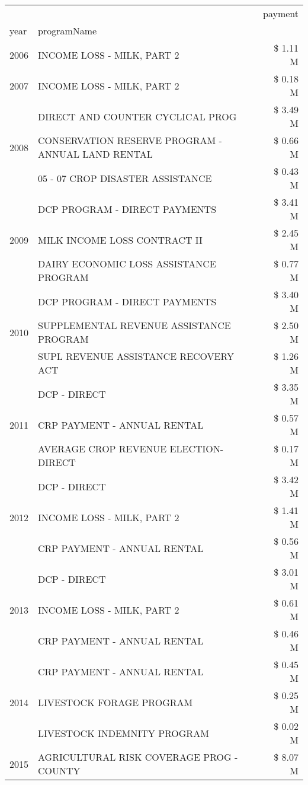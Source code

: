 \begin{tabular}{llr}
\toprule
 &  & payment \\
year & programName &  \\
\midrule
2006 & INCOME LOSS - MILK, PART 2 & \$ 1.11 M \\
\cline{1-3}
2007 & INCOME LOSS - MILK, PART 2 & \$ 0.18 M \\
\cline{1-3}
\multirow[t]{3}{*}{2008} & DIRECT AND COUNTER CYCLICAL PROG & \$ 3.49 M \\
 & CONSERVATION RESERVE PROGRAM - ANNUAL LAND RENTAL & \$ 0.66 M \\
 & 05 - 07 CROP DISASTER ASSISTANCE & \$ 0.43 M \\
\cline{1-3}
\multirow[t]{3}{*}{2009} & DCP PROGRAM - DIRECT PAYMENTS & \$ 3.41 M \\
 & MILK INCOME LOSS CONTRACT II & \$ 2.45 M \\
 & DAIRY ECONOMIC LOSS ASSISTANCE PROGRAM & \$ 0.77 M \\
\cline{1-3}
\multirow[t]{3}{*}{2010} & DCP PROGRAM - DIRECT PAYMENTS & \$ 3.40 M \\
 & SUPPLEMENTAL REVENUE ASSISTANCE PROGRAM & \$ 2.50 M \\
 & SUPL REVENUE ASSISTANCE RECOVERY ACT & \$ 1.26 M \\
\cline{1-3}
\multirow[t]{3}{*}{2011} & DCP - DIRECT & \$ 3.35 M \\
 & CRP PAYMENT - ANNUAL RENTAL & \$ 0.57 M \\
 & AVERAGE CROP REVENUE ELECTION-DIRECT & \$ 0.17 M \\
\cline{1-3}
\multirow[t]{3}{*}{2012} & DCP - DIRECT & \$ 3.42 M \\
 & INCOME LOSS - MILK, PART 2 & \$ 1.41 M \\
 & CRP PAYMENT - ANNUAL RENTAL & \$ 0.56 M \\
\cline{1-3}
\multirow[t]{3}{*}{2013} & DCP - DIRECT & \$ 3.01 M \\
 & INCOME LOSS - MILK, PART 2 & \$ 0.61 M \\
 & CRP PAYMENT - ANNUAL RENTAL & \$ 0.46 M \\
\cline{1-3}
\multirow[t]{3}{*}{2014} & CRP PAYMENT - ANNUAL RENTAL & \$ 0.45 M \\
 & LIVESTOCK FORAGE PROGRAM & \$ 0.25 M \\
 & LIVESTOCK INDEMNITY PROGRAM & \$ 0.02 M \\
\cline{1-3}
\multirow[t]{3}{*}{2015} & AGRICULTURAL RISK COVERAGE PROG - COUNTY & \$ 8.07 M \\

\end{tabular}
